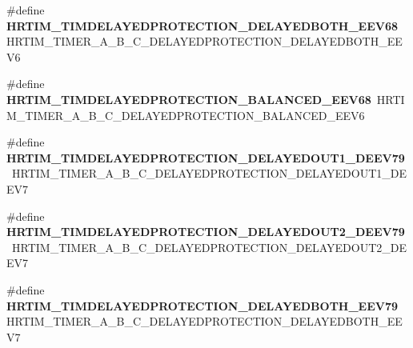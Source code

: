\begin{DoxyCompactItemize}
\#define {\bfseries H\+R\+T\+I\+M\+\_\+\+T\+I\+M\+D\+E\+L\+A\+Y\+E\+D\+P\+R\+O\+T\+E\+C\+T\+I\+O\+N\+\_\+\+D\+E\+L\+A\+Y\+E\+D\+B\+O\+T\+H\+\_\+\+E\+E\+V68}~H\+R\+T\+I\+M\+\_\+\+T\+I\+M\+E\+R\+\_\+\+A\+\_\+\+B\+\_\+\+C\+\_\+\+D\+E\+L\+A\+Y\+E\+D\+P\+R\+O\+T\+E\+C\+T\+I\+O\+N\+\_\+\+D\+E\+L\+A\+Y\+E\+D\+B\+O\+T\+H\+\_\+\+E\+E\+V6
\item 
\mbox{\label{group___h_a_l___h_r_t_i_m___aliased___macros_gacc9d18290b90bd3ba98bc6aade450b32}} 
\#define {\bfseries H\+R\+T\+I\+M\+\_\+\+T\+I\+M\+D\+E\+L\+A\+Y\+E\+D\+P\+R\+O\+T\+E\+C\+T\+I\+O\+N\+\_\+\+B\+A\+L\+A\+N\+C\+E\+D\+\_\+\+E\+E\+V68}~H\+R\+T\+I\+M\+\_\+\+T\+I\+M\+E\+R\+\_\+\+A\+\_\+\+B\+\_\+\+C\+\_\+\+D\+E\+L\+A\+Y\+E\+D\+P\+R\+O\+T\+E\+C\+T\+I\+O\+N\+\_\+\+B\+A\+L\+A\+N\+C\+E\+D\+\_\+\+E\+E\+V6
\item 
\mbox{\label{group___h_a_l___h_r_t_i_m___aliased___macros_gaf2fa730ef2ff94596dc103780c6ea28a}} 
\#define {\bfseries H\+R\+T\+I\+M\+\_\+\+T\+I\+M\+D\+E\+L\+A\+Y\+E\+D\+P\+R\+O\+T\+E\+C\+T\+I\+O\+N\+\_\+\+D\+E\+L\+A\+Y\+E\+D\+O\+U\+T1\+\_\+\+D\+E\+E\+V79}~H\+R\+T\+I\+M\+\_\+\+T\+I\+M\+E\+R\+\_\+\+A\+\_\+\+B\+\_\+\+C\+\_\+\+D\+E\+L\+A\+Y\+E\+D\+P\+R\+O\+T\+E\+C\+T\+I\+O\+N\+\_\+\+D\+E\+L\+A\+Y\+E\+D\+O\+U\+T1\+\_\+\+D\+E\+E\+V7
\item 
\mbox{\label{group___h_a_l___h_r_t_i_m___aliased___macros_ga8facb4c8782a5539246df190451ebf91}} 
\#define {\bfseries H\+R\+T\+I\+M\+\_\+\+T\+I\+M\+D\+E\+L\+A\+Y\+E\+D\+P\+R\+O\+T\+E\+C\+T\+I\+O\+N\+\_\+\+D\+E\+L\+A\+Y\+E\+D\+O\+U\+T2\+\_\+\+D\+E\+E\+V79}~H\+R\+T\+I\+M\+\_\+\+T\+I\+M\+E\+R\+\_\+\+A\+\_\+\+B\+\_\+\+C\+\_\+\+D\+E\+L\+A\+Y\+E\+D\+P\+R\+O\+T\+E\+C\+T\+I\+O\+N\+\_\+\+D\+E\+L\+A\+Y\+E\+D\+O\+U\+T2\+\_\+\+D\+E\+E\+V7
\item 
\mbox{\label{group___h_a_l___h_r_t_i_m___aliased___macros_ga81abc6daa4a2456ca1428c3fe1796e52}} 
\#define {\bfseries H\+R\+T\+I\+M\+\_\+\+T\+I\+M\+D\+E\+L\+A\+Y\+E\+D\+P\+R\+O\+T\+E\+C\+T\+I\+O\+N\+\_\+\+D\+E\+L\+A\+Y\+E\+D\+B\+O\+T\+H\+\_\+\+E\+E\+V79}~H\+R\+T\+I\+M\+\_\+\+T\+I\+M\+E\+R\+\_\+\+A\+\_\+\+B\+\_\+\+C\+\_\+\+D\+E\+L\+A\+Y\+E\+D\+P\+R\+O\+T\+E\+C\+T\+I\+O\+N\+\_\+\+D\+E\+L\+A\+Y\+E\+D\+B\+O\+T\+H\+\_\+\+E\+E\+V7
\item 

\end{DoxyCompactItemize}
